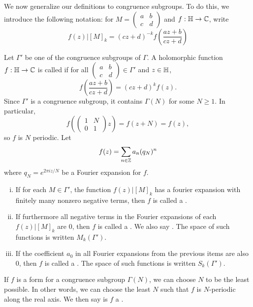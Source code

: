 \documentclass[12pt, a4paper]{report}
\begin{document}
We now generalize our definitions to congruence subgroups. To do this, we
introduce the following notation: for $M = \left(
  \begin{smallmatrix}
    a & b \\ c & d
  \end{smallmatrix}
\right)$ and $f : \mathbb{H} \rightarrow {\mathbb C}$, write
\[f (z) | [M]_k = (cz+d)^{-k} f\left( \frac{az+b}{cz+d} \right)\]

\begin{defn}
  Let $\Gamma'$ be one of the congruence subgroups of $\Gamma$. A holomorphic
  function $f: \mathbb{H} \rightarrow {\mathbb C}$ is called  if for all 
  $\left( 
    \begin{smallmatrix}
      a & b \\ c & d
    \end{smallmatrix}
  \right) \in \Gamma'$ and $z \in \mathbb{H}$,
  \[f \left( \frac{az+b}{cz+d} \right) = (cz+d)^k f(z). \]
  Since $\Gamma'$ is a congruence subgroup, it contains $\Gamma(N)$ for some $N
  \geq 1$. In particular,  $$f \left( \left( 
    \begin{smallmatrix}
      1 & N \\ 0 & 1
    \end{smallmatrix}
  \right) z \right) = f(z+N) = f(z),  $$
  so $f$ is $N$ periodic. Let 
  \[f(z) = \sum\limits_{n \in {\mathbb Z}} a_n(q_N)^n \]
  where $q_N = e^{2\pi i z/N}$ be a Fourier expansion for $f$. 

  \begin{enumerate}[(i)]
  \item If for each $M \in \Gamma'$, the function $f(z) | [M]_k$ has a
  fourier expansion with finitely many nonzero negative terms, then $f$ is
  called a .
\item If furthermore all negative terms in the Fourier expansions of each
  $f(z) | [M]_k$
  are 0, then $f$ is called a . We also say .
  The space of such functions is written $M_k(\Gamma').$
  \item If the coefficient $a_0$ in all Fourier expansions from the previous
    items are also 0, then $f$ is called a . The space of such functions is written $S_k(\Gamma').$
  \end{enumerate}
\end{defn}

If $f$ is a form for a congruence subgroup $\Gamma(N)$, we can choose $N$ to be
the least possible. In other words, we can choose the least $N$ such that $f$ is
$N$-periodic along the real axis. We then say is $f$ a .
\end{document}

